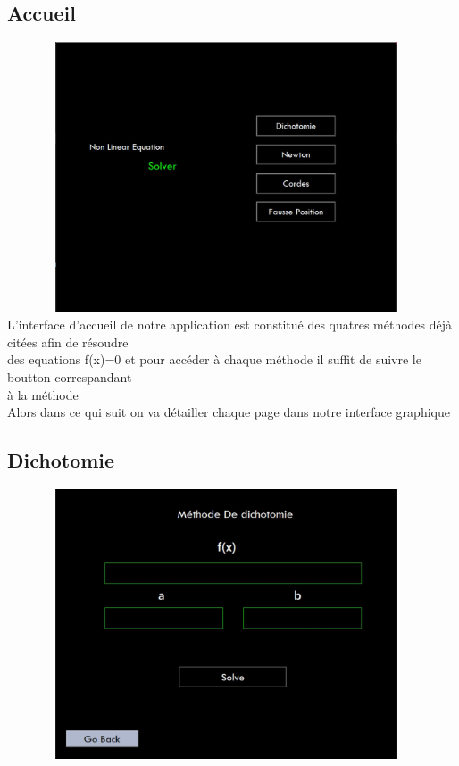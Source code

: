 \documentclass{article}
\begin{document}
\subsection{Accueil}
\includegraphics[width=13cm,height=8cm]{img/accueil.JPG}\\

L'interface d'accueil de notre application est constitué des quatres méthodes déjà citées afin de résoudre \\ des equations f(x)=0 et pour accéder à chaque méthode il suffit de suivre le boutton correspandant \\
à la méthode\\
Alors dans ce qui suit on va détailler chaque page dans notre interface graphique 

\subsection{Dichotomie}
\includegraphics[width=13cm,height=8cm]{img/dicho.JPG}\\
\end{document}
